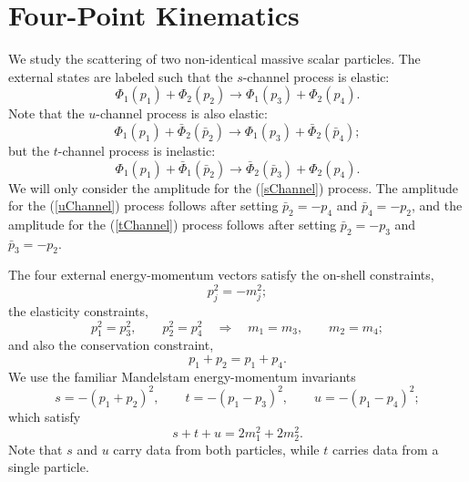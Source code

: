 \section{Four-Point Kinematics\label{app1}}
We study the scattering of two non-identical massive scalar particles. The external states are labeled such that the $s$-channel process is elastic:
\begin{equation}
	\Phi_{1}(p_{1}) + \Phi_{2}(p_{2}) \longrightarrow \Phi_{1}(p_{3}) + \Phi_{2}(p_{4}).
	\label{sChannel}
\end{equation}
Note that the $u$-channel process is also elastic:
\begin{equation}
	\Phi_{1}(p_{1}) + \bar{\Phi}_{2}(\bar{p}_{2}) \longrightarrow \Phi_{1}(p_{3}) + \bar{\Phi}_{2}(\bar{p}_{4});
	\label{uChannel}
\end{equation}
but the $t$-channel process is inelastic:
\begin{equation}
	\Phi_{1}(p_{1}) + \bar{\Phi}_{1}(\bar{p}_{2}) \longrightarrow \bar{\Phi}_{2}(\bar{p}_{3}) + \Phi_{2}(p_{4}).
	\label{tChannel}
\end{equation}
We will only consider the amplitude for the (\ref{sChannel}) process. The amplitude for the (\ref{uChannel}) process follows after setting $\bar{p}_{2} = -p_{4}$ and $\bar{p}_{4} = -p_{2}$, and the amplitude for the (\ref{tChannel}) process follows after setting $\bar{p}_{2} = -p_{3}$ and $\bar{p}_{3} = -p_{2}$.

The four external energy-momentum vectors satisfy the on-shell constraints,
\begin{equation}
	p_{j}^{2} = - m_{j}^{2};
\end{equation}
the elasticity constraints,
\begin{equation}
	p_{1}^{2} = p_{3}^{2}, \qquad p_{2}^{2} = p_{4}^{2} \quad \Longrightarrow \quad m_{1} = m_{3}, \qquad m_{2} = m_{4}; \label{elas}
\end{equation}
and also the conservation constraint,
\begin{equation}
	p_{1} + p_{2} = p_{1} + p_{4}.
\end{equation}
We use the familiar Mandelstam energy-momentum invariants
\begin{equation}
	s = -(p_{1} + p_{2})^{2}, \qquad t = -(p_{1} - p_{3})^{2}, \qquad u = -(p_{1} - p_{4})^{2};
\end{equation}
which satisfy
\begin{equation}
	s + t + u = 2 m_{1}^{2} + 2 m_{2}^{2}.
\end{equation}
Note that $s$ and $u$ carry data from both particles, while $t$ carries data from a single particle.

